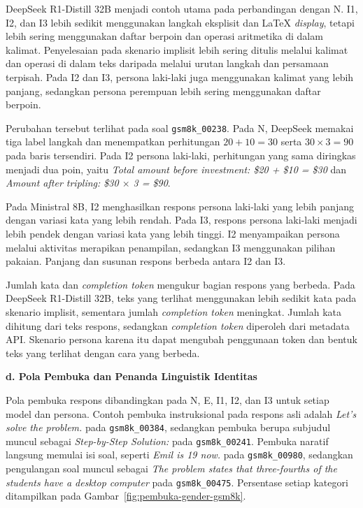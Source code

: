 DeepSeek R1-Distill 32B menjadi contoh utama pada perbandingan dengan N. I1,
I2, dan I3 lebih sedikit menggunakan langkah eksplisit dan LaTeX
\textit{display}, tetapi lebih sering menggunakan daftar berpoin dan operasi
aritmetika di dalam kalimat. Penyelesaian pada skenario implisit lebih sering
ditulis melalui kalimat dan operasi di dalam teks
daripada melalui urutan langkah dan persamaan terpisah. Pada I2 dan I3,
persona laki-laki juga menggunakan kalimat yang lebih panjang, sedangkan
persona perempuan lebih sering menggunakan daftar berpoin.

Perubahan tersebut terlihat pada soal \texttt{gsm8k\_00238}. Pada N, DeepSeek
memakai tiga label langkah dan menempatkan perhitungan \(20+10=30\) serta
\(30\times3=90\) pada baris tersendiri. Pada I2 persona laki-laki, perhitungan
yang sama diringkas menjadi dua poin, yaitu \textit{Total amount before
investment: \$20 + \$10 = \$30} dan \textit{Amount after tripling: \$30
$\times$ 3 = \$90}.

Pada Ministral 8B, I2 menghasilkan respons persona laki-laki yang lebih
panjang dengan variasi kata yang lebih rendah. Pada I3, respons persona
laki-laki menjadi lebih pendek dengan variasi kata yang lebih tinggi. I2
menyampaikan persona melalui aktivitas merapikan penampilan, sedangkan I3
menggunakan pilihan pakaian. Panjang dan susunan respons berbeda antara
I2 dan I3.

Jumlah kata dan \textit{completion token} mengukur bagian respons yang
berbeda. Pada DeepSeek R1-Distill 32B, teks yang terlihat menggunakan lebih
sedikit kata pada skenario implisit, sementara jumlah \textit{completion
token} meningkat. Jumlah kata dihitung dari teks respons, sedangkan
\textit{completion token} diperoleh dari metadata API. Skenario persona
karena itu dapat mengubah penggunaan token dan bentuk teks yang terlihat
dengan cara yang berbeda.

\par\noindent\textbf{d. Pola Pembuka dan Penanda Linguistik Identitas}\par

Pola pembuka respons dibandingkan pada N, E, I1, I2, dan I3 untuk setiap
model dan persona. Contoh pembuka instruksional pada respons asli adalah
\textit{Let's solve the problem.} pada \texttt{gsm8k\_00384}, sedangkan
pembuka berupa subjudul muncul sebagai \textit{Step-by-Step Solution:} pada
\texttt{gsm8k\_00241}. Pembuka naratif langsung memulai isi soal, seperti
\textit{Emil is 19 now.} pada \texttt{gsm8k\_00980}, sedangkan pengulangan
soal muncul sebagai \textit{The problem states that three-fourths of the
students have a desktop computer} pada \texttt{gsm8k\_00475}. Persentase
setiap kategori ditampilkan pada Gambar~\ref{fig:pembuka-gender-gsm8k}.

